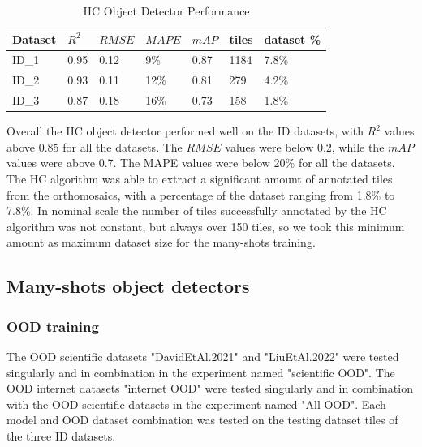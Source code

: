 \documentclass[journal,article,submit,pdftex,moreauthors]{Definitions/mdpi}
\begin{document}
\begin{table}[H]
  \caption{HC Object Detector Performance}
  \label{tab:HC_results}
  \centering
  \begin{tabularx}{\textwidth}{lXXXXXX}
  \toprule
  \textbf{Dataset} & \textbf{$R^2$} & \textbf{$RMSE$} & \textbf{$MAPE$} & \textbf{$mAP$} & \textbf{tiles} & \textbf{dataset \%} \\
  \midrule
  ID\_1 & 0.95 & 0.12 & 9\% & 0.87 & 1184 & 7.8\% \\
  ID\_2 & 0.93 & 0.11 & 12\% & 0.81 & 279 &  4.2\% \\
  ID\_3 & 0.87 & 0.18 & 16\% & 0.73 & 158 & 1.8\% \\
  \bottomrule
  \end{tabularx}
  \end{table}

Overall the HC object detector performed well on the ID datasets, with $R^2$ values
above 0.85 for all the datasets. The $RMSE$ values were below 0.2, while the $mAP$ values
were above 0.7. The MAPE values were below 20\% for all the datasets.
The HC algorithm was able to extract a significant amount of annotated tiles from the orthomosaics,
with a percentage of the dataset ranging from 1.8\% to 7.8\%.
In nominal scale the number of tiles successfully annotated by the HC algorithm was
not constant, but always over 150 tiles, so we took this minimum amount as 
maximum dataset size for the many-shots training.

\subsection{Many-shots object detectors}

\subsubsection{OOD training}

The OOD scientific datasets "DavidEtAl.2021" and "LiuEtAl.2022" were tested singularly 
and in combination in the experiment named "scientific OOD". The OOD internet datasets "internet OOD"
were tested singularly and in combination with the OOD scientific datasets in the experiment named "All OOD".
Each model and OOD dataset combination was tested on the testing dataset tiles of the three ID datasets.
\end{document}
